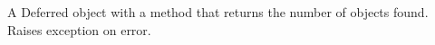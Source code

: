A Deferred object with a  method that returns the number of objects
found.  Raises exception on error.

